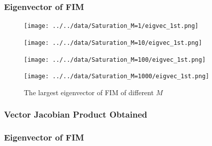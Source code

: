 \documentclass[
]{article}
\begin{document}
\subsubsection{Eigenvector of FIM}\label{eigenvector-of-fim}

\begin{figure}

\begin{minipage}{0.25\linewidth}

\texttt{[image: ../../data/Saturation\_M=1/eigvec\_1st.png]}

\end{minipage}%
%
\begin{minipage}{0.25\linewidth}

\texttt{[image: ../../data/Saturation\_M=10/eigvec\_1st.png]}

\end{minipage}%
%
\begin{minipage}{0.25\linewidth}

\texttt{[image: ../../data/Saturation\_M=100/eigvec\_1st.png]}

\end{minipage}%
%
\begin{minipage}{0.25\linewidth}

\texttt{[image: ../../data/Saturation\_M=1000/eigvec\_1st.png]}

\end{minipage}%

\caption{\label{fig-eig1000}The largest eigenvector of FIM of different
\(M\)}

\end{figure}%

\subsubsection{Vector Jacobian Product
Obtained}\label{vector-jacobian-product-obtained}

\subsubsection{Eigenvector of FIM}\label{eigenvector-of-fim-1}
\end{document}
